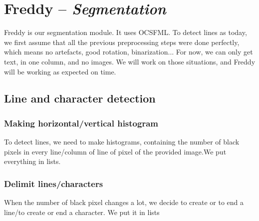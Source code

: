\chapter{Freddy -- \emph{Segmentation}}

Freddy is our segmentation module. It uses OCSFML.
To detect lines as today, we first assume that all the previous preprocessing steps were done perfectly, which means no artefacts, good rotation, binarization... For now, we can only get text, in one column, and no images. We will work on those situations, and Freddy will be working as expected on time.

\begin{center}
\end{center}

\begin{center}
\end{center}

\section{Line and character detection}

\subsection{Making horizontal/vertical histogram}

To detect lines, we need to make histograms, containing the number of black pixels in every line/column of line of pixel of the provided image.We put everything in lists.

\subsection{Delimit lines/characters}

When the number of black pixel changes a lot, we decide to create or to end a line/to create or end a character. We put it in lists
